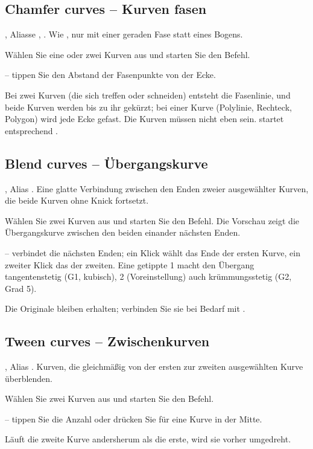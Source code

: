 \subsection{Chamfer curves -- Kurven fasen}\label{sec:cmd-chamfer}
, Aliasse , . Wie , nur mit
einer geraden Fase statt eines Bogens.
\begin{schritte}
\item Wählen Sie eine oder zwei Kurven aus und starten Sie den Befehl.
\item {} -- tippen Sie den Abstand der Fasenpunkte von der Ecke.
\end{schritte}
Bei zwei Kurven (die sich treffen oder schneiden) entsteht die Fasenlinie, und beide Kurven
werden bis zu ihr gekürzt; bei einer Kurve (Polylinie, Rechteck, Polygon) wird jede Ecke
gefast. Die Kurven müssen nicht eben sein.  startet entsprechend
.

\subsection{Blend curves -- Übergangskurve}\label{sec:cmd-blend}
, Alias . Eine glatte Verbindung zwischen den Enden zweier
ausgewählter Kurven, die beide Kurven ohne Knick fortsetzt.
\begin{schritte}
\item Wählen Sie zwei Kurven aus und starten Sie den Befehl. Die Vorschau zeigt die
  Übergangskurve zwischen den beiden einander nächsten Enden.
\item {} --  verbindet die nächsten Enden; ein Klick wählt das Ende der
  ersten Kurve, ein zweiter Klick das der zweiten. Eine getippte 1 macht den Übergang
  tangentenstetig (G1, kubisch), 2 (Voreinstellung) auch krümmungsstetig (G2, Grad 5).
\end{schritte}
Die Originale bleiben erhalten; verbinden Sie sie bei Bedarf mit .

\subsection{Tween curves -- Zwischenkurven}\label{sec:cmd-tween}
, Alias . Kurven, die gleichmäßig von der ersten zur zweiten
ausgewählten Kurve überblenden.
\begin{schritte}
\item Wählen Sie zwei Kurven aus und starten Sie den Befehl.
\item {} -- tippen Sie die Anzahl oder drücken Sie
   für eine Kurve in der Mitte.
\end{schritte}
Läuft die zweite Kurve andersherum als die erste, wird sie vorher umgedreht.

